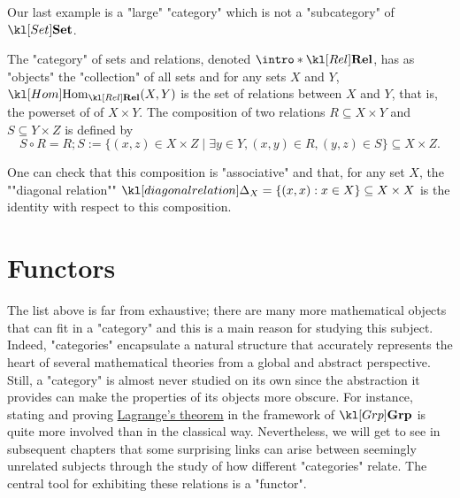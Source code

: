 \documentclass[main.tex]{subfiles}
\begin{document}
Our last example is a "large" "category" which is not a "subcategory" of $\catSet$.
\begin{exmp}
    \AP The "category" of sets and relations, denoted $\intro*\catRel$, has as "objects" the "collection" of all sets and for any sets $X$ and $Y$, $\Hom_{\catRel}(X,Y)$ is the set of relations between $X$ and $Y$, that is, the powerset of of $X\times Y$. The composition of two relations $R \subseteq X\times Y$ and $S \subseteq Y\times Z$ is defined by
    \[S\circ R = R;S := \{(x,z) \in X\times Z \mid \exists y \in Y, (x,y) \in R, (y,z) \in S\} \subseteq X \times Z.\]
	
    \AP One can check that this composition is "associative" and that, for any set $X$, the ""diagonal relation"" $\diagRel_X = \{(x,x) : x \in X\} \subseteq X \times X$ is the identity with respect to this composition.
\end{exmp}

\section{Functors}
The list above is far from exhaustive; there are many more mathematical objects that can fit in a "category" and this is a main reason for studying this subject. Indeed, "categories" encapsulate a natural structure that accurately represents the heart of several mathematical theories from a global and abstract perspective. Still, a "category" is almost never studied on its own since the abstraction it provides can make the properties of its objects more obscure. For instance, stating and proving \href{https://en.wikipedia.org/wiki/Lagrange%27s_theorem_(group_theory)}{Lagrange's theorem} in the framework of $\catGrp$ is quite more involved than in the classical way. Nevertheless, we will get to see in subsequent chapters that some surprising links can arise between seemingly unrelated subjects through the study of how different "categories" relate. The central tool for exhibiting these relations is a "functor".%
\end{document}
